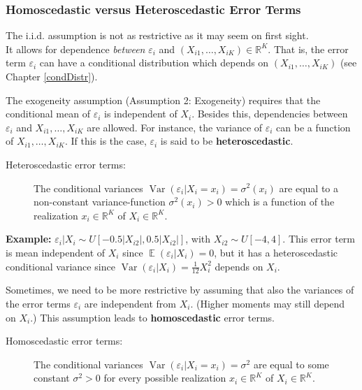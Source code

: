 \documentclass[
  14pt,
]{memoir}
\DeclareMathOperator{\E}{\mathbb{E}}
\DeclareMathOperator{\V}{\operatorname{Var}}
\begin{document}
\hypertarget{homoscedastic-versus-heteroscedastic-error-terms}{%
\subsubsection*{Homoscedastic versus Heteroscedastic Error Terms}\label{homoscedastic-versus-heteroscedastic-error-terms}}

The i.i.d. assumption is not as restrictive as it may seem on first sight.\\
It allows for dependence \textit{between} \(\varepsilon_i\) and \((X_{i1},\dots,X_{iK})\in\mathbb{R}^K\).
That is, the error term \(\varepsilon_i\) can have a conditional distribution which depends on
\((X_{i1},\dots,X_{iK})\) (see Chapter \ref{condDistr}).

The exogeneity assumption (Assumption 2: Exogeneity) requires that the conditional mean of
\(\varepsilon_i\) is independent of \(X_i\). Besides this, dependencies between
\(\varepsilon_i\) and \(X_{i1},\dots,X_{iK}\) are allowed.
For instance, the variance of \(\varepsilon_i\) can be a function of \(X_{i1},\dots,X_{iK}\).
If this is the case, \(\varepsilon_i\) is said to be \textbf{heteroscedastic}.

\begin{description}
\item[Heteroscedastic error terms:] The conditional variances 
$\V(\varepsilon_i|X_i=x_i)=\sigma^2(x_i)$ are equal to a 
non-constant variance-function $\sigma^2(x_i)>0$ which is a function of the 
realization $x_i\in\mathbb{R}^K$ of $X_i\in\mathbb{R}^K$. 
\end{description}

\textbf{Example:} \(\varepsilon_i|X_i\sim U[-0.5|X_{i2}|, 0.5|X_{i2}|]\),
with \(X_{i2}\sim U[-4,4]\). This error term is mean independent of \(X_i\)
since \(\E(\varepsilon_i|X_i)=0\), but it has a heteroscedastic conditional variance
since \(\V(\varepsilon_i|X_i)=\frac{1}{12}X_i^2\) depends on \(X_i\).

Sometimes, we need to be more restrictive by assuming that also the variances of the error terms
\(\varepsilon_i\) are independent from \(X_i\). (Higher moments may still depend on \(X_i\).)
This assumption leads to \textbf{homoscedastic} error terms.

\begin{description}
\item[Homoscedastic error terms:] The conditional variances 
$\V(\varepsilon_i|X_i=x_i)=\sigma^2$ are equal to some constant $\sigma^2>0$ for every possible 
realization $x_i\in\mathbb{R}^K$ of $X_i\in\mathbb{R}^K$. 
\end{description}
\end{document}
